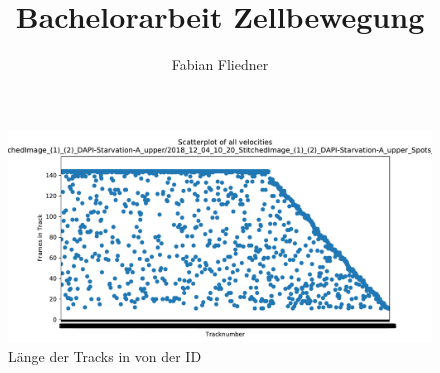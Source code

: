 \documentclass[]{article}
\title{Bachelorarbeit Zellbewegung}
\author{Fabian Fliedner}
\begin{document}
\maketitle

\begin{abstract}

\end{abstract}

\section{}
\begin{figure}
	\centering
	\includegraphics[width=0.7\linewidth]{BildDateien/length_of_all_tracks}
	\caption[Tracklänge nach ID]{Länge der Tracks in von der ID}
	\label{fig:lengthofalltracks}
\end{figure}
\end{document}
